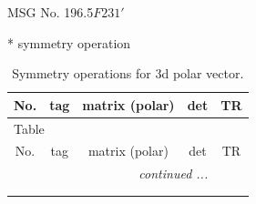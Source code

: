 \documentclass[fleqn,8pt]{jsarticle}
\begin{document}
\setcounter{MaxMatrixCols}{32}

\renewcommand{\tablename}{Table~}
\renewcommand{\figurename}{Figure~}
\begin{center}
\LARGE
MSG No. 196.5\quad$F231'$
\end{center}
* symmetry operation
\renewcommand{\arraystretch}{1.3}
\begin{longtable}{ccccc}
\caption{Symmetry operations for 3d polar vector.}
 \\
 \hline \hline
No. & tag & matrix (polar) & det & TR \\ \hline \endfirsthead

\multicolumn{4}{l}{\tablename\ \thetable{}} \\
 \hline \hline
No. & tag & matrix (polar) & det & TR \\ \hline \endhead

 \hline \hline
\multicolumn{4}{r}{\footnotesize\it continued ...} \\ \endfoot

 \hline \hline
\multicolumn{4}{r}{} \\ \endlastfoot


\end{longtable}
\end{document}
